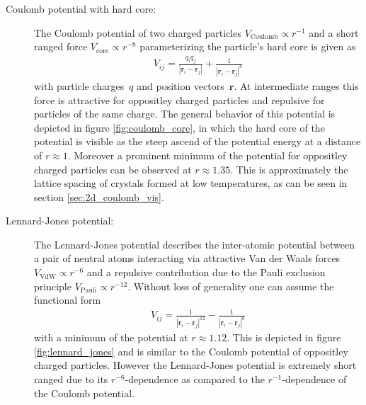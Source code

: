 \documentclass[11pt, a4paper]{article}
\numberwithin{equation}{section}
\begin{document}
\begin{description}
	\item[Coulomb potential with hard core:]
		The Coulomb potential of two charged particles $V_\mathrm{Coulomb} \propto r^{-1}$ and a short ranged force $V_\mathrm{core} \propto r^{-8}$ parameterizing the particle's hard core  is given as
		\begin{align*}
			V_{ij} = \frac{q_i q_j}{| \mathbf{r}_i - \mathbf{r}_j |} + \frac{1}{| \mathbf{r}_i - \mathbf{r}_j |^8}
		\end{align*}
		with particle charges~$q$ and position vectors~$\mathbf{r}$.
		At intermediate ranges this force is attractive for oppositley charged particles and repulsive for particles of the same charge.
		The general behavior of this potential is depicted in figure \ref{fig:coulomb_core}, in which the hard core of the potential is visible as the steep ascend of the potential energy at a distance of $r \approx 1$.
		Moreover a prominent minimum of the potential for oppositley charged particles can be observed at $r \approx 1.35$.
		This is approximately the lattice spacing of crystals formed at low temperatures, as can be seen in section \ref{sec:2d_coulomb_vis}.
		
	\item[Lennard-Jones potential:]
		The Lennard-Jones potential describes the inter-atomic potential between a pair of neutral atoms interacting via attractive Van der Waals forces $V_\mathrm{VdW} \propto r^{-6}$ and a repulsive contribution due to the Pauli exclusion principle $V_\mathrm{Pauli} \propto r^{-12}$.
		Without loss of generality one can assume the functional form
		\begin{align*}
			V_{ij} = \frac{1}{| \mathbf{r}_i - \mathbf{r}_j |^{12}} - \frac{1}{| \mathbf{r}_i - \mathbf{r}_j |^6}
		\end{align*}
		with a minimum of the potential at $r\approx \num{1.12}$.
		This is depicted in figure \ref{fig:lennard_jones} and is similar to the Coulomb potential of oppositley charged particles.
		However the Lennard-Jones potential is extremely short ranged due to its $r^{-6}$-dependence as compared to the $r^{-1}$-dependence of the Coulomb potential.
				
\end{description}
\end{document}
